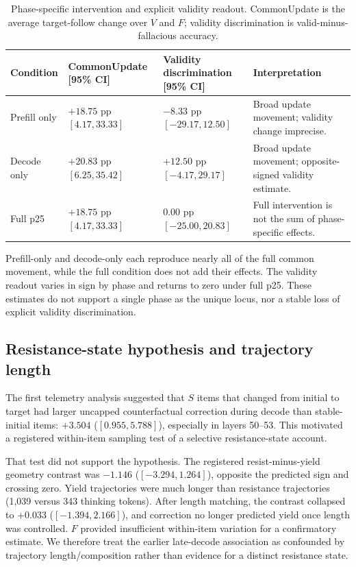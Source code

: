\documentclass[letterpaper]{article}
\begin{document}
\begin{table}[t]
\centering
\small
\begin{tabular}{lL{4.0cm}L{4.0cm}L{4.0cm}}
\toprule
Condition & CommonUpdate [95\% CI] & Validity discrimination [95\% CI] & Interpretation \\
\midrule
Prefill only & $+18.75$ pp $[4.17,33.33]$ & $-8.33$ pp $[-29.17,12.50]$ & Broad update movement; validity change imprecise. \\
Decode only & $+20.83$ pp $[6.25,35.42]$ & $+12.50$ pp $[-4.17,29.17]$ & Broad update movement; opposite-signed validity estimate. \\
Full p25 & $+18.75$ pp $[4.17,33.33]$ & $0.00$ pp $[-25.00,20.83]$ & Full intervention is not the sum of phase-specific effects. \\
\bottomrule
\end{tabular}
\caption{Phase-specific intervention and explicit validity readout. CommonUpdate is the average target-follow change over $V$ and $F$; validity discrimination is valid-minus-fallacious accuracy.}
\label{tab:supp-phase}
\end{table}

Prefill-only and decode-only each reproduce nearly all of the full common movement, while the full condition does not add their effects.  The validity readout varies in sign by phase and returns to zero under full p25.  These estimates do not support a single phase as the unique locus, nor a stable loss of explicit validity discrimination.

\subsection{Resistance-state hypothesis and trajectory length}

The first telemetry analysis suggested that $S$ items that changed from initial to target had larger uncapped counterfactual correction during decode than stable-initial items: $+3.504$ ($[0.955,5.788]$), especially in layers 50--53.  This motivated a registered within-item sampling test of a selective resistance-state account.

That test did not support the hypothesis.  The registered resist-minus-yield geometry contrast was $-1.146$ ($[-3.294,1.264]$), opposite the predicted sign and crossing zero.  Yield trajectories were much longer than resistance trajectories (1,039 versus 343 thinking tokens).  After length matching, the contrast collapsed to $+0.033$ ($[-1.394,2.166]$), and correction no longer predicted yield once length was controlled.  $F$ provided insufficient within-item variation for a confirmatory estimate.  We therefore treat the earlier late-decode association as confounded by trajectory length/composition rather than evidence for a distinct resistance state.
\end{document}
